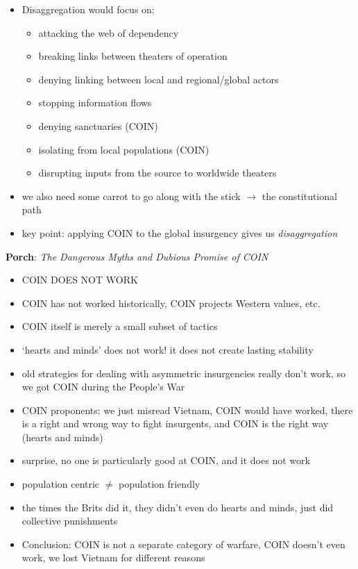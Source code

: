 \documentclass{article}
\begin{document}
\begin{itemize}
    \item Disaggregation would focus on:
    \begin{itemize}
        \item attacking the web of dependency
        \item breaking links between theaters of operation
        \item denying linking between local and regional/global actors
        \item stopping information flows
        \item denying sanctuaries (COIN)
        \item isolating from local populations (COIN)
        \item disrupting inputs from the source to worldwide theaters
    \end{itemize}
    \item we also need some carrot to go along with the stick $\rightarrow$ the constitutional path
    \item key point: applying COIN to the global insurgency gives us \textit{disaggregation}
\end{itemize}
\medskip
\textbf{Porch}: \textit{The Dangerous Myths and Dubious Promise of COIN}
\begin{itemize}
    \item COIN DOES NOT WORK
    \item COIN has not worked historically, COIN projects Western values, etc.
    \item COIN itself is merely a small subset of tactics
    \item `hearts and minds' does not work! it does not create lasting stability
    \item old strategies for dealing with asymmetric insurgencies really don't work, so we got COIN during the People's War
    \item COIN proponents: we just misread Vietnam, COIN would have worked, there is a right and wrong way to fight insurgents, and COIN is the right way (hearts and minds)
    \item surprise, no one is particularly good at COIN, and it does not work
    \item population centric $\neq$ population friendly
    \item the times the Brits did it, they didn't even do hearts and minds, just did collective punishments
    \item Conclusion: COIN is not a separate category of warfare, COIN doesn't even work, we lost Vietnam for different reasons
\end{itemize}
\end{document}
